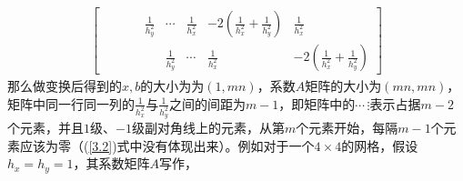 \documentclass{article} %
\begin{document}
\begin{align}
\begin{bmatrix}
                                            &                                     &                                     &                                     & \frac{1}{h_y^2}                                     & \cdots                              & \frac{1}{h_x^2}                     & -2(\frac{1}{h_x^2}+\frac{1}{h_y^2}) & \frac{1}{h_x^2}                     \\
                                            &                                     &                                     &                                     &                                                     & \frac{1}{h_y^2}                     & \cdots                              & \frac{1}{h_x^2}                     & -2(\frac{1}{h_x^2}+\frac{1}{h_y^2})
    \end{bmatrix} \label{3.2}
\end{align}
那么做变换后得到的$x,b$的大小为为$(1,mn)$，系数$A$矩阵的大小为$(mn,mn)$，矩阵中同一行同一列的$\frac{1}{h_x^2}$与$\frac{1}{h_y^2}$之间的间距为$m-1$，即矩阵中的$\cdots\,\vdots$表示占据$m-2$个元素，并且$1$级、$-1$级副对角线上的元素，从第$m$个元素开始，每隔$m-1$个元素应该为零（(\ref{3.2})式中没有体现出来）。例如对于一个$4\times 4$的网格，假设$h_x=h_y=1$，其系数矩阵$A$写作，
\end{document}
